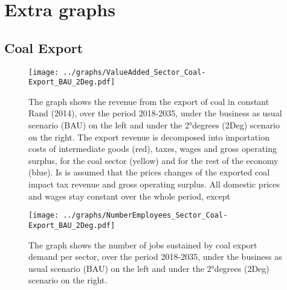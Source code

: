 \documentclass[12pt,english]{article}
\begin{document}
\section{Extra graphs}

\subsection{Coal Export}

\begin{figure}[!h]
	\hspace{-10pt}\texttt{[image: ../graphs/ValueAdded\_Sector\_Coal-Export\_BAU\_2Deg.pdf]}
	\caption{\label{ValueAdded_Sector_Coal-Export_BAU_2Deg}\small The graph shows the revenue from the export of coal in constant Rand (2014), over the period 2018-2035, under the business as usual scenario (BAU) on the left and under the 2°degrees (2Deg) scenario on the right. The export revenue is decomposed into importation costs of intermediate goods (red), taxes, wages and gross operating surplus, for the coal sector (yellow) and for the rest of the economy (blue). Is is assumed that the prices changes of the exported coal impact tax revenue and gross operating surplus. All domestic prices and wages stay constant over the whole period, except  }
\end{figure}


\begin{figure}[!h]
	\hspace{-10pt}\texttt{[image: ../graphs/NumberEmployees\_Sector\_Coal-Export\_BAU\_2Deg.pdf]}
	\caption{\label{NumberEmployees_Sector_Coal-Export_BAU_2Deg}\small The graph shows the number of jobs sustained by coal export demand per sector, over the period 2018-2035, under the business as usual scenario (BAU) on the left and under the 2°degrees (2Deg) scenario on the right.}
\end{figure}
\end{document}
